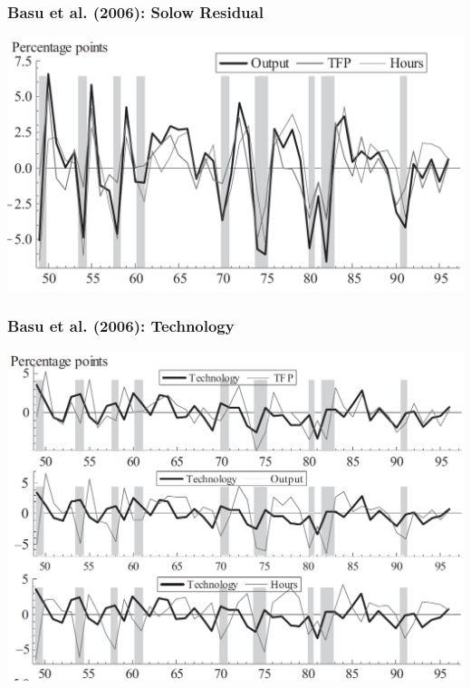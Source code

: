 \documentclass[english,xcolor=svgnames]{beamer}
\begin{document}
\begin{frame}
\frametitle{Basu et al. (2006): Solow Residual}
\centering
\includegraphics[scale=0.6]{../../Images/BFK2006TFP.png}	
\end{frame}

\begin{frame}
\frametitle{Basu et al. (2006): Technology}
\centering
\includegraphics[scale=0.6]{../../Images/BFK2006Technology.png}	
\end{frame}
\end{document}
